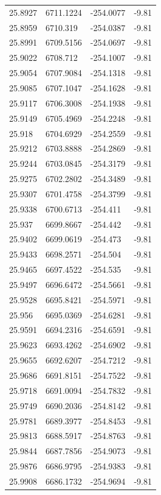 \begin{table}[H]
\begin{tabular}{llll}
25.8927 & 6711.1224 & -254.0077 & -9.81 \\
25.8959 & 6710.319 & -254.0387 & -9.81 \\
25.8991 & 6709.5156 & -254.0697 & -9.81 \\
25.9022 & 6708.712 & -254.1007 & -9.81 \\
25.9054 & 6707.9084 & -254.1318 & -9.81 \\
25.9085 & 6707.1047 & -254.1628 & -9.81 \\
25.9117 & 6706.3008 & -254.1938 & -9.81 \\
25.9149 & 6705.4969 & -254.2248 & -9.81 \\
25.918 & 6704.6929 & -254.2559 & -9.81 \\
25.9212 & 6703.8888 & -254.2869 & -9.81 \\
25.9244 & 6703.0845 & -254.3179 & -9.81 \\
25.9275 & 6702.2802 & -254.3489 & -9.81 \\
25.9307 & 6701.4758 & -254.3799 & -9.81 \\
25.9338 & 6700.6713 & -254.411 & -9.81 \\
25.937 & 6699.8667 & -254.442 & -9.81 \\
25.9402 & 6699.0619 & -254.473 & -9.81 \\
25.9433 & 6698.2571 & -254.504 & -9.81 \\
25.9465 & 6697.4522 & -254.535 & -9.81 \\
25.9497 & 6696.6472 & -254.5661 & -9.81 \\
25.9528 & 6695.8421 & -254.5971 & -9.81 \\
25.956 & 6695.0369 & -254.6281 & -9.81 \\
25.9591 & 6694.2316 & -254.6591 & -9.81 \\
25.9623 & 6693.4262 & -254.6902 & -9.81 \\
25.9655 & 6692.6207 & -254.7212 & -9.81 \\
25.9686 & 6691.8151 & -254.7522 & -9.81 \\
25.9718 & 6691.0094 & -254.7832 & -9.81 \\
25.9749 & 6690.2036 & -254.8142 & -9.81 \\
25.9781 & 6689.3977 & -254.8453 & -9.81 \\
25.9813 & 6688.5917 & -254.8763 & -9.81 \\
25.9844 & 6687.7856 & -254.9073 & -9.81 \\
25.9876 & 6686.9795 & -254.9383 & -9.81 \\
25.9908 & 6686.1732 & -254.9694 & -9.81 \\

\end{tabular}
\end{table}
